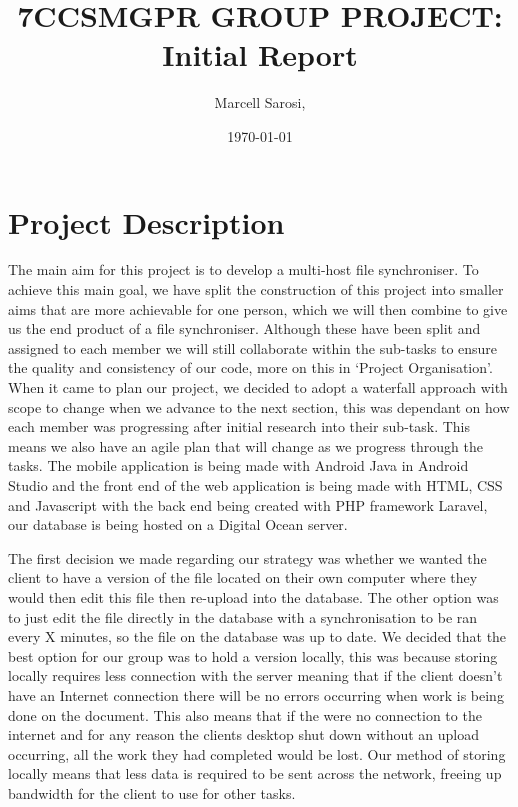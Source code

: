 \documentclass[11pt]{informatics-report}
\title{7CCSMGPR GROUP PROJECT:\\\vspace{0.2cm}Initial Report}
\author{Marcell Sarosi, }
\date{\today}
\begin{document}
\createFrontMatter
\onehalfspacing
\tableofcontents
\doublespacing


\chapter{Project Description}

The main aim for this project is to develop a multi-host file synchroniser. To achieve this main goal, we have split the construction of this project into smaller aims that are more achievable for one person, which we will then combine to give us the end product of a file synchroniser. Although these have been split and assigned to each member we will still collaborate within the sub-tasks to ensure the quality and consistency of our code, more on this in ‘Project Organisation’.  When it came to plan our project, we decided to adopt a waterfall approach with scope to change when we advance to the next section, this was dependant on how each member was progressing after initial research into their sub-task. This means we also have an agile plan that will change as we progress through the tasks. The mobile application is being made with Android Java in Android Studio and the front end of the web application is being made with HTML, CSS and Javascript with the back end being created with PHP framework Laravel, our database is being hosted on a Digital Ocean server.

The first decision we made regarding our strategy was whether we wanted the client to have a version of the file located on their own computer where they would then edit this file then re-upload into the database. The other option was to just edit the file directly in the database with a synchronisation to be ran every X minutes, so the file on the database was up to date. We decided that the best option for our group was to hold a version locally, this was because storing locally requires less connection with the server meaning that if the client doesn’t have an Internet connection there will be no errors occurring when work is being done on the document. This also means that if the were no connection to the internet and for any reason the clients desktop shut down without an upload occurring, all the work they had completed would be lost. Our method of storing locally means that less data is required to be sent across the network, freeing up bandwidth for the client to use for other tasks. 
\end{document}
